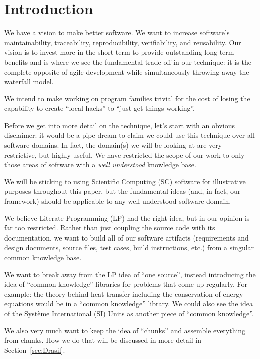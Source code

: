 \documentclass[preprint, 10pt]{sigplanconf}
\begin{document}
\section{Introduction}
\label{sec:Intro}

We have a vision to make better software. We want to increase software's
maintainability, traceability, reproducibility, verifiability, and reusability.
Our vision is to invest more in the short-term to provide outstanding long-term
benefits and is where we see the fundamental trade-off in our technique: it is
the complete opposite of agile-development while simultaneously throwing away
the waterfall model.

We intend to make working on program families trivial for the cost of losing the
capability to create ``local hacks'' to ``just get things working''.

Before we get into more detail on the technique, let's start with an obvious
disclaimer: it would be a pipe dream to claim we could use this technique over
all software domains. In fact, the domain(s) we will be looking at are very
restrictive, but highly useful. We have restricted the scope of our work to only
those areas of software with a \emph{well understood} knowledge base.

We will be sticking to using Scientific Computing (SC) software for illustrative
purposes throughout this paper, but the fundamental ideas (and, in fact, our
framework) should be applicable to any well understood software domain.

We believe Literate Programming (LP) had the right idea, but in our opinion is
far too restricted. Rather than just coupling the source code with its
documentation, we want to build all of our software artifacts (requirements and
design documents, source files, test cases, build instructions, etc.) from a
singular common knowledge base.

We want to break away from the LP idea of ``one source'', instead introducing
the idea of ``common knowledge'' libraries for problems that come up regularly.
For example: the theory behind heat transfer including the conservation of
energy equations would be in a ``common knowledge'' library. We could also see
the idea of the Syst\`{e}me International (SI) Units as another piece of
``common knowledge''.

We also very much want to keep the idea of ``chunks'' and assemble everything
from chunks. How we do that will be discussed in more detail in
Section~\ref{sec:Drasil}.
\end{document}
